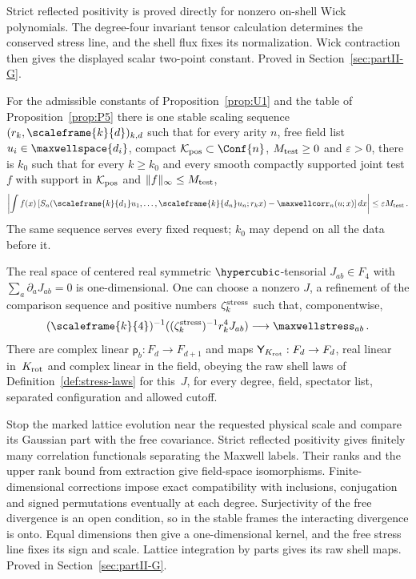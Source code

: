 Strict reflected positivity is proved directly for nonzero on-shell Wick
polynomials. The degree-four invariant tensor calculation determines the
conserved stress line, and the shell flux fixes its normalization. Wick
contraction then gives the displayed scalar two-point constant.
Proved in Section~\ref{sec:partII-G}.

\begin{proposition}\label{prop:P6}
For the admissible constants of Proposition~\ref{prop:U1} and the table of Proposition~\ref{prop:P5} there is one stable scaling sequence~$(r_k,\scaleframe{k}{d})_{k,d}$ such that for every arity $n$, free field list $u_i\in \maxwellspace{d_i}$, compact $\mathcal K_{\rm pos}\subset\Conf{n}$, $M_{\rm test}\ge0$ and $\varepsilon>0$, there is $k_0$ such that for every $k\ge k_0$ and every smooth compactly supported joint test $f$ with support in $\mathcal K_{\rm pos}$ and $\|f\|_\infty\le M_{\rm test}$,
\begin{equation}\label{eq:P6-1}
\left|\int f(x)\left[S_n(\scaleframe{k}{d_1}u_1,\ldots,\scaleframe{k}{d_n}u_n;r_kx)-\maxwellcorr_n(u;x)\right]dx\right|\le\varepsilon M_{\rm test}\,.
\end{equation}
The same sequence serves every fixed request; $k_0$ may depend on all the data before it.

The real space of centered real symmetric $\hypercubic$-tensorial $J_{ab}\in F_4$ with $\sum_a\partial_aJ_{ab}=0$ is one-dimensional. One can choose a nonzero $J$, a refinement of the comparison sequence and positive numbers $\zeta_k^{\rm stress}$ such that, componentwise,
\begin{equation}\label{eq:P6-2}
(\scaleframe{k}{4})^{-1}((\zeta_k^{\rm stress})^{-1}r_k^4J_{ab})\longrightarrow \maxwellstress_{ab}\,.
\end{equation}
There are complex linear $\mathsf p_b:F_d\to F_{d+1}$ and maps $\mathsf Y_{K_{\rm rot}}:F_d\to F_d$, real linear in~$K_{\rm rot}$ and complex linear in the field, obeying the raw shell laws of Definition~\ref{def:stress-laws} for this~$J$, for every degree, field, spectator list, separated configuration and allowed cutoff.
\end{proposition}

Stop the marked lattice evolution near the requested physical scale and
compare its Gaussian part with the free covariance. Strict reflected positivity
gives finitely many correlation functionals separating the Maxwell labels.
Their ranks and the upper rank bound from extraction give field-space
isomorphisms. Finite-dimensional corrections impose exact compatibility with
inclusions, conjugation and signed permutations eventually at each degree.
Surjectivity of the free divergence is an open condition, so in the stable frames
the interacting divergence is onto. Equal dimensions then give a one-dimensional
kernel, and the free stress line fixes its sign and scale. Lattice integration by
parts gives its raw shell maps. Proved in Section~\ref{sec:partII-G}.

